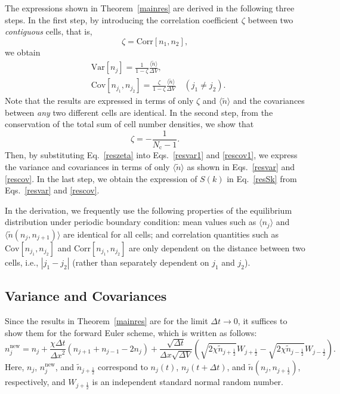 \documentclass{article}
\newcommand{\Var}{\mathrm{Var}}
\newcommand{\Cov}{\mathrm{Cov}}
\newcommand{\Corr}{\mathrm{Corr}}
\newcommand{\dx}{{\Delta x}}
\newcommand{\dt}{{\Delta t}}
\newcommand{\dV}{{\Delta V}}
\newcommand{\avgntilde}{{\langle\tilde{n}\rangle}}
\newcommand{\Nc}{{N_\mathrm{c}}}
\begin{document}
The expressions shown in Theorem~\ref{mainres} are derived in the following three steps.
In the first step, by introducing the correlation coefficient $\zeta$ between two \textit{contiguous} cells, that is,
\begin{equation}
\zeta=\Corr[n_1,n_2],
\end{equation}
we obtain 
\begin{align}
\label{resvar1}
&\Var[n_j]=\frac{1}{1-\zeta}\frac{\avgntilde}{\dV},\\
\label{rescov1}
&\Cov[n_{j_1},n_{j_2}]=\frac{\zeta}{1-\zeta}\frac{\avgntilde}{\dV}\quad(j_1\ne j_2).
\end{align}
Note that the results are expressed in terms of only $\zeta$ and $\avgntilde$ and the covariances between \textit{any} two different cells are identical.
In the second step, from the conservation of the total sum of cell number densities, we show that
\begin{equation}
\label{reszeta}
\zeta=-\frac{1}{\Nc-1}.
\end{equation}
Then, by substituting Eq.~\eqref{reszeta} into Eqs.~\eqref{resvar1} and \eqref{rescov1}, we express the variance and covariances in terms of only $\avgntilde$ as shown in Eqs.~\eqref{resvar} and \eqref{rescov}.
In the last step, we obtain the expression of $S(k)$ in Eq.~\eqref{resSk} from Eqs.~\eqref{resvar} and \eqref{rescov}.

In the derivation, we frequently use the following properties of the equilibrium distribution under periodic boundary condition:
mean values such as $\langle n_j\rangle$ and $\langle \tilde{n}(n_j,n_{j+1})\rangle$ are identical for all cells;
and correlation quantities such as $\Cov[n_{j_1},n_{j_2}]$ and $\Corr[n_{j_1},n_{j_2}]$ are only dependent on the distance between two cells, i.e., $|j_1-j_2|$ (rather than separately dependent on $j_1$ and $j_2$).

\subsection{Variance and Covariances}

Since the results in Theorem~\ref{mainres} are for the limit $\dt\rightarrow 0$, it suffices to show them for the forward Euler scheme, which is written as follows:
\begin{equation}
\label{feuler}
n_j^\mathrm{new} =n_j+\frac{\chi\dt}{\dx^2}(n_{j+1}+n_{j-1}-2n_j)
+\frac{\sqrt{\dt}}{\dx\sqrt{\dV}}\left(
\sqrt{2\chi\tilde{n}_{j+\frac12}}W_{j+\frac12}
-\sqrt{2\chi\tilde{n}_{j-\frac12}}W_{j-\frac12}
\right).
\end{equation}
Here, $n_j$, $n_j^\mathrm{new}$, and $\tilde{n}_{j+\frac12}$ correspond to $n_j(t)$, $n_j(t+\dt)$, and $\tilde{n}(n_j,n_{j+\frac12})$, respectively, and 
$W_{j+\frac12}$ is an independent standard normal random number.
\end{document}
